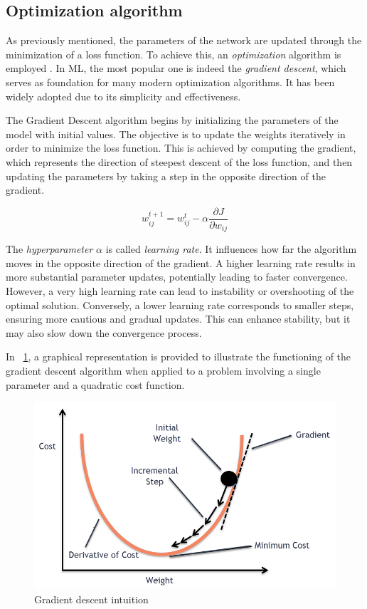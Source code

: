 \subsection{Optimization algorithm}

As previously mentioned, the parameters of the network are updated through the minimization of a loss function. To achieve this, an \textit{optimization} algorithm is employed \cite{Goodfellow-et-al-2016}. In ML, the most popular one is indeed the \textit{gradient descent}, which serves as foundation for many modern optimization algorithms. It has been widely adopted due to its simplicity and effectiveness.

The Gradient Descent algorithm begins by initializing the parameters of the model with initial values. The objective is to update the weights iteratively in order to minimize the loss function. This is achieved by computing the gradient, which represents the direction of steepest descent of the loss function, and then updating the parameters by taking a step in the opposite direction of the gradient.

\[
	w_{ij}^{t+1} = w_{ij}^t - \alpha\frac{\partial J}{\partial w_{ij}}
\]

The \textit{hyperparameter} $\alpha$ is called \textit{learning rate}. It influences how far the algorithm moves in the opposite direction of the gradient. A higher learning rate results in more substantial parameter updates, potentially leading to faster convergence. However, a very high learning rate can lead to instability or overshooting of the optimal solution. Conversely, a lower learning rate corresponds to smaller steps, ensuring more cautious and gradual updates. This can enhance stability, but it may also slow down the convergence process.

In \Fig~\ref{fig:graddesc}, a graphical representation is provided to illustrate the functioning of the gradient descent algorithm when applied to a problem involving a single parameter and a quadratic cost function.

\begin{figure}[h]
	\centering
	\includegraphics[width=0.6\linewidth]{ImageFiles/NeuralNetworks/graddesc}
	\caption{Gradient descent intuition \cite{GDAWML}}
	\label{fig:graddesc}
\end{figure}

